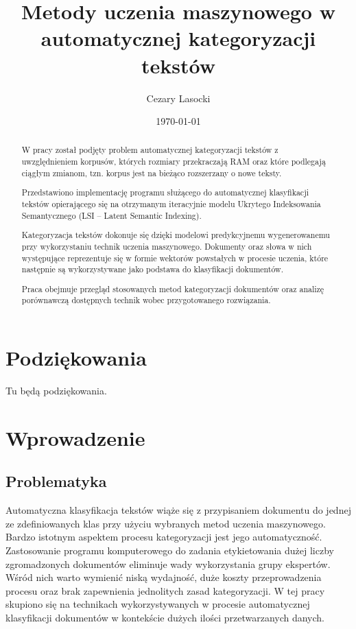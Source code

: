 \documentclass{pracamgr}
\author{Cezary Lasocki}
\title{Metody uczenia maszynowego w automatycznej kategoryzacji tekstów}
\date{\today}
\begin{document}
\maketitle

\begin{abstract}

W pracy został podjęty problem automatycznej kategoryzacji tekstów z uwzględnieniem korpusów, których rozmiary przekraczają RAM oraz które podlegają ciągłym zmianom, tzn. korpus jest na bieżąco rozszerzany o nowe teksty.

Przedstawiono implementację programu służącego do automatycznej klasyfikacji tekstów opierającego się na otrzymanym iteracyjnie modelu Ukrytego Indeksowania Semantycznego (LSI – Latent Semantic Indexing). 

Kategoryzacja tekstów dokonuje się dzięki modelowi predykcyjnemu wygenerowanemu przy wykorzystaniu technik uczenia maszynowego. Dokumenty oraz słowa w nich występujące reprezentuje się w formie wektorów powstałych w procesie uczenia, które następnie są wykorzystywane jako podstawa do klasyfikacji dokumentów.

Praca obejmuje przegląd stosowanych metod kategoryzacji dokumentów oraz analizę porównawczą dostępnych technik wobec przygotowanego rozwiązania.
\end{abstract}

\chapter*{Podziękowania}

Tu będą podziękowania.

\tableofcontents

\chapter{Wprowadzenie}

\section{Problematyka}
Automatyczna klasyfikacja tekstów wiąże się z przypisaniem dokumentu do jednej ze zdefiniowanych klas przy użyciu wybranych metod uczenia maszynowego. Bardzo istotnym aspektem procesu kategoryzacji jest jego automatyczność. Zastosowanie programu komputerowego do zadania etykietowania dużej liczby zgromadzonych dokumentów eliminuje wady wykorzystania grupy ekspertów. Wśród nich warto wymienić niską wydajność, duże koszty przeprowadzenia procesu oraz brak zapewnienia jednolitych zasad kategoryzacji. W tej pracy skupiono się na technikach wykorzystywanych w procesie automatycznej klasyfikacji dokumentów w kontekście dużych ilości przetwarzanych danych.
\end{document}
